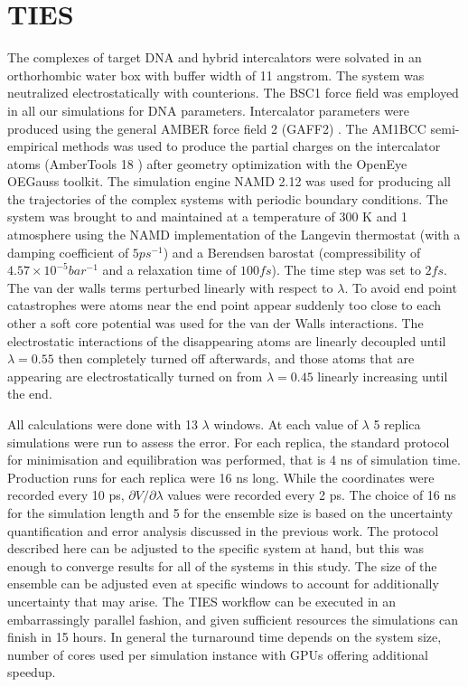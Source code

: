 \section{TIES}

The complexes of target DNA and hybrid intercalators were solvated in an orthorhombic water box with buffer width of 11 angstrom. The system was neutralized electrostatically with counterions. The BSC1\cite{ivani2016parmbsc1} force field was employed in all our simulations for DNA parameters. Intercalator parameters were produced using the general AMBER force field 2 (GAFF2) \cite{wang2004development}. The AM1BCC \cite{jakalian2002fast} %
semi-empirical methods was used to produce the partial charges on the intercalator atoms (AmberTools 18 \cite{ambertools18}) after geometry optimization with the OpenEye OEGauss toolkit. The simulation engine NAMD 2.12 was used for producing all the trajectories of the complex systems with periodic boundary conditions. The system was brought to and maintained at a temperature of 300 K and 1 atmosphere using the NAMD implementation of the Langevin thermostat (with a damping coefficient of $5 ps^{-1}$) and a Berendsen barostat (compressibility of $4.57 \times 10^{-5} bar^{-1}$ and a relaxation time of $100 fs$). The time step was set to $2 fs$. The van der walls terms perturbed linearly with respect to $\lambda$. To avoid end point catastrophes were atoms near the end point appear suddenly too close to each other a soft core potential was used for the van der Walls interactions. The electrostatic interactions of the disappearing atoms are linearly decoupled until $\lambda = 0.55$ then completely turned off afterwards, and those atoms that are appearing are electrostatically turned on from $\lambda = 0.45$ linearly increasing until the end.

All calculations were done with 13 $\lambda$ windows. At each value of $\lambda$ 5 replica simulations were run to assess the error. For each replica, the standard protocol for minimisation and equilibration was performed, that is 4 ns of simulation time. Production runs for each replica were 16 ns long. While the coordinates were recorded every 10 ps, $\partial V / \partial \lambda$ values were recorded every 2 ps. The choice of 16 ns for the simulation length and 5 for the ensemble size is based on the uncertainty quantification and error analysis discussed in the previous work. The protocol described here can be adjusted to the specific system at hand, but this was enough to converge results for all of the systems in this study. The size of the ensemble can be adjusted even at specific windows to account for additionally uncertainty that may arise. The TIES workflow can be executed in an embarrassingly parallel fashion, and given sufficient resources the simulations can finish in 15 hours. In general the turnaround time depends on the system size, number of cores used per simulation instance with GPUs offering additional speedup.